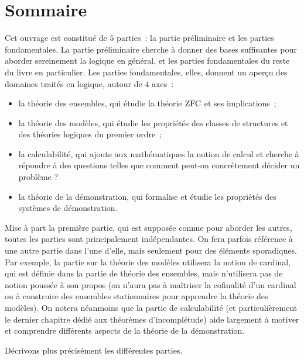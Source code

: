 \chapter[Sommaire]{Sommaire}

Cet ouvrage est constitué de $5$ parties~: la partie préliminaire et les parties
fondamentales. La partie préliminaire cherche à donner des bases suffisantes
pour aborder sereinement la logique en général, et les parties fondamentales du
reste du livre en particulier. Les parties fondamentales, elles, donnent un
aperçu des domaines traités en logique, autour de $4$ axes~:
\begin{itemize}
\item la théorie des ensembles, qui étudie la théorie $\operatorname{ZFC}$ et ses
  implications~;
\item la théorie des modèles, qui étudie les propriétés des classes de
  structures et des théories logiques du premier ordre~;
\item la calculabilité, qui ajoute aux mathématiques la notion de calcul et
  cherche à répondre à des questions telles que \og comment peut-on concrètement
  décider un problème ?\fg
\item la théorie de la démonstration, qui formalise et étudie les propriétés des
  systèmes de démonstration.
\end{itemize}

Mise à part la première partie, qui est supposée connue pour aborder les autres,
toutes les parties sont principalement indépendantes. On fera parfois référence
à une autre partie dans l'une d'elle, mais seulement pour des éléments
sporadiques. Par exemple, la partie sur la théorie des modèles utilisera la
notion de cardinal, qui est définie dans la partie de théorie des ensembles,
mais n'utilisera pas de notion poussée à son propos (on n'aura pas à maîtriser
la cofinalité d'un cardinal ou à construire des ensembles stationnaires pour
apprendre la théorie des modèles). On notera néanmoins que la partie de
calculabilité (et particulièrement le dernier chapitre dédié aux théorèmes
d'incomplétude) aide largement à motiver et comprendre différents aspects de la
théorie de la démonstration.

Décrivons plus précisément les différentes parties.

